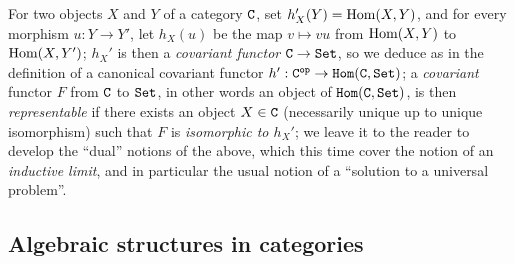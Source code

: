 \begin{env}[8.1.11]
\label{0.8.1.11}
For two objects $X$ and $Y$ of a category $\mathtt{C}$, set $h_X'(Y)={\mathop{\mathrm{Hom}}\nolimits}(X,Y)$, and for every morphism $u:Y\to Y'$, let $h_X(u)$ be the map $v\mapsto vu$ from ${\mathop{\mathrm{Hom}}\nolimits}(X,Y)$ to ${\mathop{\mathrm{Hom}}\nolimits}(X,Y')$; $h_X'$ is then a \emph{covariant functor $\C\to\Set$}, so we deduce as in  the definition of a canonical covariant functor $h':\C\op\to\CHom(\C,\Set)$; a \emph{covariant} functor $F$ from $\mathtt{C}$ to $\mathtt{Set}$, in other words an object of $\mathtt{Hom}(\mathtt{C},\mathtt{Set})$, is then \emph{representable} if there exists an object $X\in\mathtt{C}$ (necessarily unique up to unique isomorphism) such that $F$ is \emph{isomorphic to $h_X'$}; we leave it to the reader to develop the ``dual'' notions of the above, which this time cover the notion of an \emph{inductive limit}, and in particular the usual notion of a ``solution to a universal problem''.
\end{env}

\subsection{Algebraic structures in categories}
\label{subsection:algebraic-structures-in-categories}

